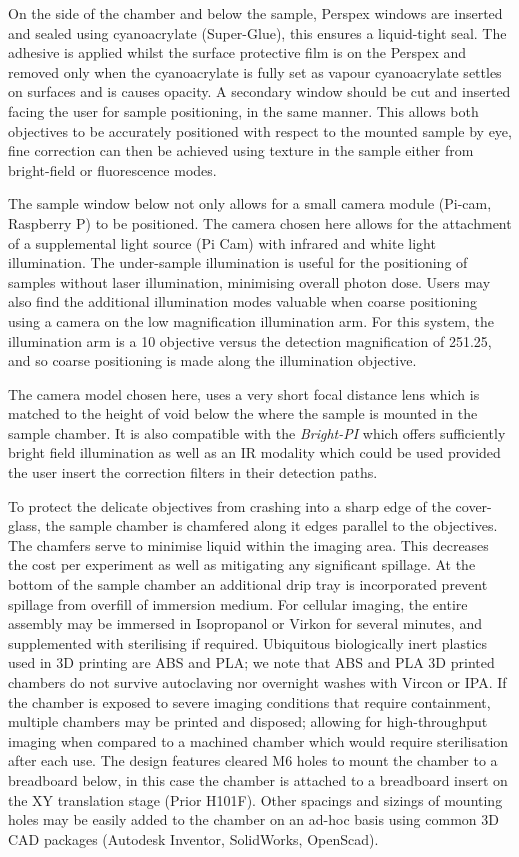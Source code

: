 On the side of the chamber and below the sample, Perspex windows are inserted and sealed using cyanoacrylate (Super-Glue), this ensures a liquid-tight seal.
The adhesive is applied whilst the surface protective film is on the Perspex and removed only when the cyanoacrylate is fully set as vapour cyanoacrylate settles on surfaces and is causes opacity.
A secondary window should be cut and inserted facing the user for sample positioning, in the same manner.
This allows both objectives to be accurately positioned with respect to the mounted sample by eye, fine correction can then be achieved using texture in the sample either from bright-field or fluorescence modes.

The sample window below not only allows for a small camera module (Pi-cam, Raspberry P) to be positioned.
The camera chosen here allows for the attachment of a supplemental light source (Pi Cam) with infrared and white light illumination.
The under-sample illumination is useful for the positioning of samples without laser illumination, minimising overall photon dose.
Users may also find the additional illumination modes valuable when coarse positioning using a camera on the low magnification illumination arm.
For this system, the illumination arm is a \SI{10}{\times} objective versus the detection magnification of \SI{25}{\times}\SI{1.25}{\times}, and so coarse positioning is made along the illumination objective.

The camera model chosen here, uses a very short focal distance lens which is matched to the height of void below the where the sample is mounted in the sample chamber.
It is also compatible with the \emph{Bright-PI} which offers sufficiently bright field illumination as well as an IR modality which could be used provided the user insert the correction filters in their detection paths.

To protect the delicate objectives from crashing into a sharp edge of the cover-glass, the sample chamber is chamfered along it edges parallel to the objectives.
The chamfers serve to minimise liquid within the imaging area.
This decreases the cost per experiment as well as mitigating any significant spillage.
At the bottom of the sample chamber an additional drip tray is incorporated prevent spillage from overfill of immersion medium.
For cellular imaging, the entire assembly may be immersed in Isopropanol or Virkon for several minutes, and supplemented with sterilising if required.
Ubiquitous biologically inert plastics used in 3D printing are ABS and PLA; we note that ABS and PLA 3D printed chambers do not survive autoclaving nor overnight washes with Vircon or IPA.
If the chamber is exposed to severe imaging conditions that require containment, multiple chambers may be printed and disposed; allowing for high-throughput imaging when compared to a machined chamber which would require sterilisation after each use.
The design features cleared M6 holes to mount the chamber to a breadboard below, in this case the chamber is attached to a breadboard insert on the XY translation stage (Prior  H101F).
Other spacings and sizings of mounting holes may be easily added to the chamber on an ad-hoc basis using common 3D CAD packages (Autodesk Inventor, SolidWorks, OpenScad).

